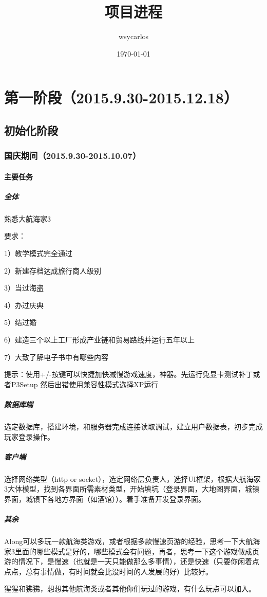 \documentclass[UTF8]{ctexart}
\title{项目进程}
\author{wsycarlos}
\date{\today}
\begin{document}
\maketitle
\section{第一阶段（2015.9.30-2015.12.18）}

\subsection{初始化阶段}

\subsubsection{国庆期间（2015.9.30-2015.10.07）}
\paragraph{主要任务}
\subparagraph{全体}
熟悉大航海家3

要求：

1）教学模式完全通过

2）新建存档达成旅行商人级别

3）当过海盗

4）办过庆典

5）结过婚

6）建造三个以上工厂形成产业链和贸易路线并运行五年以上

7）大致了解电子书中有哪些内容


提示：使用+/-按键可以快捷加快减慢游戏速度，神器。先运行免显卡测试补丁或者P3Setup 然后出错使用兼容性模式选择XP运行

\subparagraph{数据库端}
选定数据库，搭建环境，和服务器完成连接读取调试，建立用户数据表，初步完成玩家登录操作。

\subparagraph{客户端}
选择网络类型（http or socket），选定网络层负责人，选择UI框架，根据大航海家3大体模型，找到各界面所需素材类型，开始填坑（登录界面，大地图界面，城镇界面，城镇下各地方界面（如酒馆））。着手准备开发登录界面。

\subparagraph{其余}
Along可以多玩一款航海类游戏，或者根据多款慢速页游的经验，思考一下大航海家3里面的哪些模式是好的，哪些模式会有问题，再者，思考一下这个游戏做成页游的情况下，是慢速（也就是一天只能做那么多事情），还是快速（只要你闲着点点点，总有事情做，有时间就会比没时间的人发展的好）比较好。

猩猩和狒狒，想想其他航海类或者其他你们玩过的游戏，有什么玩点可以加入。
\end{document}
